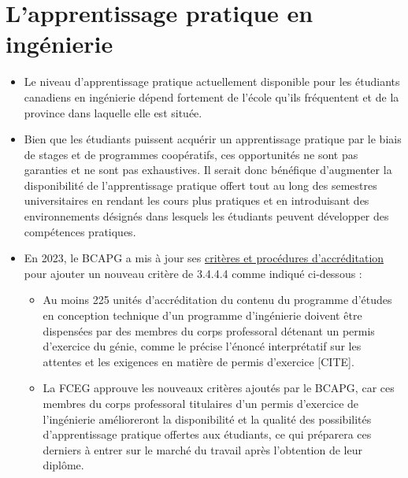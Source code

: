 \section{L'apprentissage pratique en ingénierie}\label{lapprentissage-pratique-en-ingenierie}



\begin{itemize}
 \item Le niveau d'apprentissage pratique actuellement disponible pour les étudiants canadiens en ingénierie dépend fortement de l'école qu'ils fréquentent et de la province dans laquelle elle est située.
 \item Bien que les étudiants puissent acquérir un apprentissage pratique par le biais de stages et de programmes coopératifs, ces opportunités ne sont pas garanties et ne sont pas exhaustives. Il serait donc bénéfique d'augmenter la disponibilité de l'apprentissage pratique offert tout au long des semestres universitaires en rendant les cours plus pratiques et en introduisant des environnements désignés dans lesquels les étudiants peuvent développer des compétences pratiques.
 \item En 2023, le BCAPG a mis à jour ses \href{https://engineerscanada.ca/sites/default/files/2023-12/Accreditation_Criteria_Procedures_2023.pdf}{critères et procédures d'accréditation} pour ajouter un nouveau critère de 3.4.4.4 comme indiqué ci-dessous :
 \begin{itemize}
  \item Au moins 225 unités d'accréditation du contenu du programme d'études en conception technique d'un programme d'ingénierie doivent être dispensées par des membres du corps professoral détenant un permis d'exercice du génie, comme le précise l'énoncé interprétatif sur les attentes et les exigences en matière de permis d'exercice [CITE].
  \item La FCEG approuve les nouveaux critères ajoutés par le BCAPG, car ces membres du corps professoral titulaires d'un permis d'exercice de l'ingénierie amélioreront la disponibilité et la qualité des possibilités d'apprentissage pratique offertes aux étudiants, ce qui préparera ces derniers à entrer sur le marché du travail après l'obtention de leur diplôme.
 \end{itemize}
\end{itemize}

